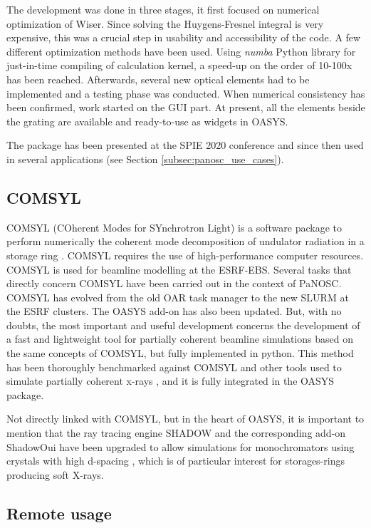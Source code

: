 \documentclass[11pt, a4paper]{article}
\begin{document}
The development was done in three stages, it first focused on numerical optimization of Wiser. Since solving the Huygens-Fresnel integral is very expensive, this was a crucial step in usability and accessibility of the code. A few different optimization methods have been used. Using \emph{numba} Python library for just-in-time compiling of calculation kernel, a speed-up on the order of 10-100x has been reached. Afterwards, several new optical elements had to be implemented and a testing phase was conducted. When numerical consistency has been confirmed, work started on the GUI part. At present, all the elements beside the grating are available and ready-to-use as widgets in OASYS.

The package has been presented at the SPIE 2020 conference \cite{manfredda2020} and since then used in several applications (see Section \ref{subsec:panosc_use_cases}).

\subsection{COMSYL}

 COMSYL (COherent Modes for SYnchrotron Light) is a software package to perform numerically the coherent mode decomposition of undulator radiation in a storage ring \cite{Glass2017}. COMSYL requires the use of high-performance computer resources. COMSYL is used for beamline modelling at the ESRF-EBS. Several tasks that directly concern COMSYL have been carried out in the context of PaNOSC. COMSYL has evolved from the old OAR task manager to the new SLURM at the ESRF clusters. The OASYS add-on has also been updated. But, with no doubts, the most important and useful development concerns the development of a fast and lightweight tool for partially coherent beamline simulations \cite{SanchezdelRio2022} based on the same concepts of COMSYL, but fully implemented in python. This method has been thoroughly benchmarked against COMSYL and other tools used to simulate partially coherent x-rays \cite{SanchezdelRio2022}, and it is fully integrated in the OASYS package.

Not directly linked with COMSYL, but in the heart of OASYS, it is important to mention that the ray tracing engine SHADOW and the corresponding add-on ShadowOui have been upgraded to allow simulations for monochromators using crystals with high d-spacing \cite{Yu2022}, which is of particular interest for storages-rings producing soft X-rays.  

\subsection{Remote usage}
\end{document}
